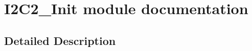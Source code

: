 \hypertarget{group___i2_c2___init__module}{}\section{I2\+C2\+\_\+\+Init module documentation}
\label{group___i2_c2___init__module}


\subsection{Detailed Description}
